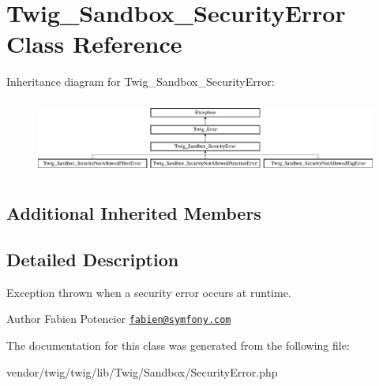 \hypertarget{classTwig__Sandbox__SecurityError}{}\section{Twig\+\_\+\+Sandbox\+\_\+\+Security\+Error Class Reference}
\label{classTwig__Sandbox__SecurityError}
Inheritance diagram for Twig\+\_\+\+Sandbox\+\_\+\+Security\+Error\+:\begin{figure}[H]
\begin{center}
\leavevmode
\includegraphics[height=2.497213cm]{classTwig__Sandbox__SecurityError}
\end{center}
\end{figure}
\subsection*{Additional Inherited Members}


\subsection{Detailed Description}
Exception thrown when a security error occurs at runtime.

\begin{DoxyAuthor}{Author}
Fabien Potencier \href{mailto:fabien@symfony.com}{\tt fabien@symfony.\+com} 
\end{DoxyAuthor}


The documentation for this class was generated from the following file\+:\begin{DoxyCompactItemize}
\item 
vendor/twig/twig/lib/\+Twig/\+Sandbox/Security\+Error.\+php\end{DoxyCompactItemize}
